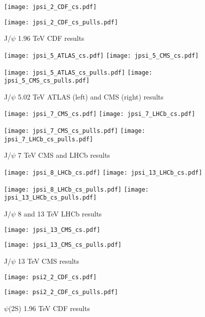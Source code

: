\documentclass{article}
\begin{document}

\begin{figure}
\centering
\texttt{[image: jpsi\_2\_CDF\_cs.pdf]}

\texttt{[image: jpsi\_2\_CDF\_cs\_pulls.pdf]}
\caption{J/$\psi$ 1.96 TeV CDF results}
\end{figure}

\clearpage

\begin{figure}
\centering
\texttt{[image: jpsi\_5\_ATLAS\_cs.pdf]}
\texttt{[image: jpsi\_5\_CMS\_cs.pdf]}

\texttt{[image: jpsi\_5\_ATLAS\_cs\_pulls.pdf]}
\texttt{[image: jpsi\_5\_CMS\_cs\_pulls.pdf]}
\caption{J/$\psi$ 5.02 TeV ATLAS (left) and CMS (right) results}
\end{figure}

\clearpage

\begin{figure}
\centering
\texttt{[image: jpsi\_7\_CMS\_cs.pdf]}
\texttt{[image: jpsi\_7\_LHCb\_cs.pdf]}

\texttt{[image: jpsi\_7\_CMS\_cs\_pulls.pdf]}
\texttt{[image: jpsi\_7\_LHCb\_cs\_pulls.pdf]}
\caption{J/$\psi$ 7 TeV CMS and LHCb results}
\end{figure}

\clearpage

\begin{figure}
\centering
\texttt{[image: jpsi\_8\_LHCb\_cs.pdf]}
\texttt{[image: jpsi\_13\_LHCb\_cs.pdf]}

\texttt{[image: jpsi\_8\_LHCb\_cs\_pulls.pdf]}
\texttt{[image: jpsi\_13\_LHCb\_cs\_pulls.pdf]}
\caption{J/$\psi$ 8 and 13 TeV LHCb results}
\end{figure}

\clearpage

\begin{figure}
\centering
\texttt{[image: jpsi\_13\_CMS\_cs.pdf]}

\texttt{[image: jpsi\_13\_CMS\_cs\_pulls.pdf]}
\caption{J/$\psi$ 13 TeV CMS results}
\end{figure}

\clearpage

\begin{figure}
\centering
\texttt{[image: psi2\_2\_CDF\_cs.pdf]}

\texttt{[image: psi2\_2\_CDF\_cs\_pulls.pdf]}
\caption{$\psi$(2S) 1.96 TeV CDF results}
\end{figure}
\end{document}
